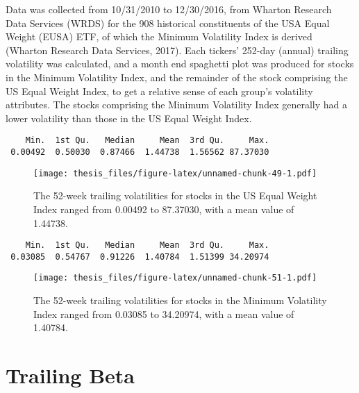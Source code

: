 \documentclass[12pt,twoside]{reedthesis}
\theoremstyle{definition}
\theoremstyle{definition}
\theoremstyle{definition}
\theoremstyle{remark}
\begin{document}
Data was collected from 10/31/2010 to 12/30/2016, from Wharton Research
Data Services (WRDS) for the 908 historical constituents of the USA
Equal Weight (EUSA) ETF, of which the Minimum Volatility Index is
derived (Wharton Research Data Services, 2017). Each tickers' 252-day
(annual) trailing volatility was calculated, and a month end spaghetti
plot was produced for stocks in the Minimum Volatility Index, and the
remainder of the stock comprising the US Equal Weight Index, to get a
relative sense of each group's volatility attributes. The stocks
comprising the Minimum Volatility Index generally had a lower volatility
than those in the US Equal Weight Index.
\begin{verbatim}
    Min.  1st Qu.   Median     Mean  3rd Qu.     Max. 
 0.00492  0.50030  0.87466  1.44738  1.56562 87.37030 
\end{verbatim}
\begin{figure}[htbp]
\centering
\texttt{[image: thesis\_files/figure-latex/unnamed-chunk-49-1.pdf]}
\caption{\label{fig:unnamed-chunk-49}The 52-week trailing volatilities for
stocks in the US Equal Weight Index ranged from 0.00492 to 87.37030,
with a mean value of 1.44738.}
\end{figure}
\begin{verbatim}
    Min.  1st Qu.   Median     Mean  3rd Qu.     Max. 
 0.03085  0.54767  0.91226  1.40784  1.51399 34.20974 
\end{verbatim}
\begin{figure}[htbp]
\centering
\texttt{[image: thesis\_files/figure-latex/unnamed-chunk-51-1.pdf]}
\caption{\label{fig:unnamed-chunk-51}The 52-week trailing volatilities for
stocks in the Minimum Volatility Index ranged from 0.03085 to 34.20974,
with a mean value of 1.40784.}
\end{figure}
\section{Trailing Beta}\label{trailing-beta}
\end{document}
